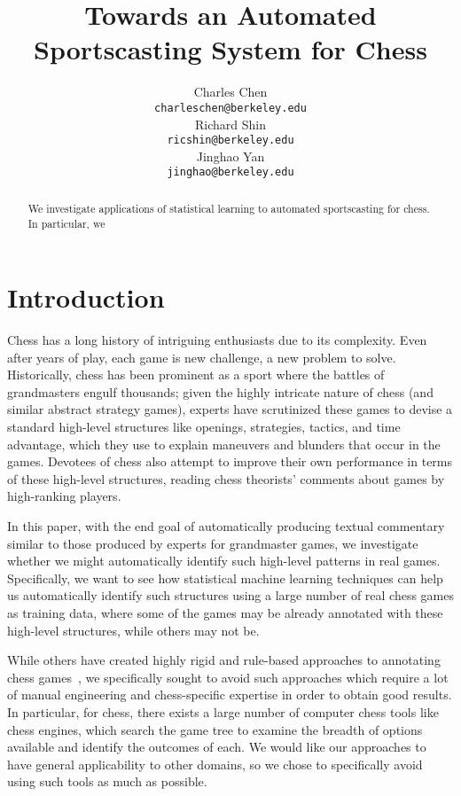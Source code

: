 \documentclass[11pt]{article}
\title{Towards an Automated Sportscasting System for Chess}
\author{
  Charles Chen \\
  {\tt charleschen@berkeley.edu} \\
\And
  Richard Shin \\
  {\tt ricshin@berkeley.edu} \\
\And
  Jinghao Yan \\
  {\tt jinghao@berkeley.edu} \\
}
\date{}
\begin{document}
\maketitle

\begin{abstract}
We investigate applications of statistical learning to automated sportscasting for chess. In particular, we 
\end{abstract}

\section{Introduction}
Chess has a long history of intriguing enthusiasts due to its complexity. Even after years of play, each game is new challenge, a new problem to solve. Historically, chess has been prominent as a sport where the battles of grandmasters engulf thousands; given the highly intricate nature of chess (and similar abstract strategy games), experts have scrutinized these games to devise a standard high-level structures like openings, strategies, tactics, and time advantage, which they use to explain maneuvers and blunders that occur in the games. Devotees of chess also attempt to improve their own performance in terms of these high-level structures, reading chess theorists' comments about games by high-ranking players. 

In this paper, with the end goal of automatically producing textual commentary similar to those produced by experts for grandmaster games, we investigate whether we might automatically identify such high-level patterns in real games. Specifically, we want to see how statistical machine learning techniques can help us automatically identify such structures using a large number of real chess games as training data, where some of the games may be already annotated with these high-level structures, while others may not be.

While others have created highly rigid and rule-based approaches to annotating chess games~\cite{cambridge-chess-annotation}, we specifically sought to avoid such approaches which require a lot of manual engineering and chess-specific expertise in order to obtain good results. In particular, for chess, there exists a large number of computer chess tools like chess engines, which search the game tree to examine the breadth of options available and identify the outcomes of each. We would like our approaches to have general applicability to other domains, so we chose to specifically avoid using such tools as much as possible. 
\end{document}
